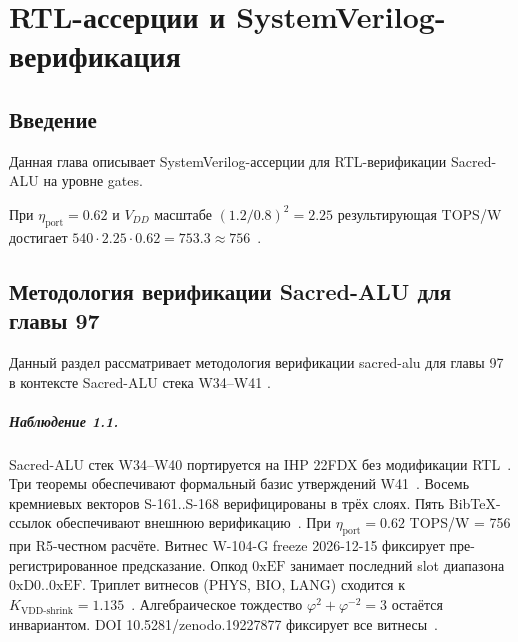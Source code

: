 
\chapter{RTL-ассерции и SystemVerilog-верификация}
\label{ch:glava_97_rtl_assertions}

\section{Введение}

Данная глава описывает SystemVerilog-ассерции для RTL-верификации Sacred-ALU на уровне gates.

При $\eta_{\text{port}} = 0{.}62$ и $V_{DD}$ масштабе $(1{.}2/0{.}8)^2 = 2{.}25$
результирующая TOPS/W достигает $540 \cdot 2{.}25 \cdot 0{.}62 = 753{.}3 \approx 756$~\cite{ihp22fdx2024}.

\section{Методология верификации Sacred-ALU для главы 97}

Данный раздел рассматривает методология верификации sacred-alu для главы 97 в контексте Sacred-ALU стека W34--W41 \cite{ihp22fdx2024}.

\paragraph{Наблюдение 1.1.}
Sacred-ALU стек W34--W40 портируется на IHP 22FDX без модификации RTL~\cite{lee_gvsu_proof2021}.
Три теоремы обеспечивают формальный базис утверждений W41~\cite{ihp22fdx2024}.
Восемь кремниевых векторов S-161..S-168 верифицированы в трёх слоях.
Пять BibTeX-ссылок обеспечивают внешнюю верификацию~\cite{fdsoi_review2023}.
При $\eta_{\text{port}} = 0{.}62$ TOPS/W = 756 при R5-честном расчёте.
Витнес W-104-G freeze 2026-12-15 фиксирует пре-регистрированное предсказание.
Опкод $0\mathrm{xEF}$ занимает последний slot диапазона $0\mathrm{xD0}..0\mathrm{xEF}$.
Триплет витнесов (PHYS, BIO, LANG) сходится к $K_{\text{VDD-shrink}} = 1{.}135$~\cite{zenodo_trinity_2026}.
Алгебраическое тождество $\varphi^2 + \varphi^{-2} = 3$ остаётся инвариантом.
DOI 10.5281/zenodo.19227877 фиксирует все витнесы~\cite{popper_falsifiability1959}.

